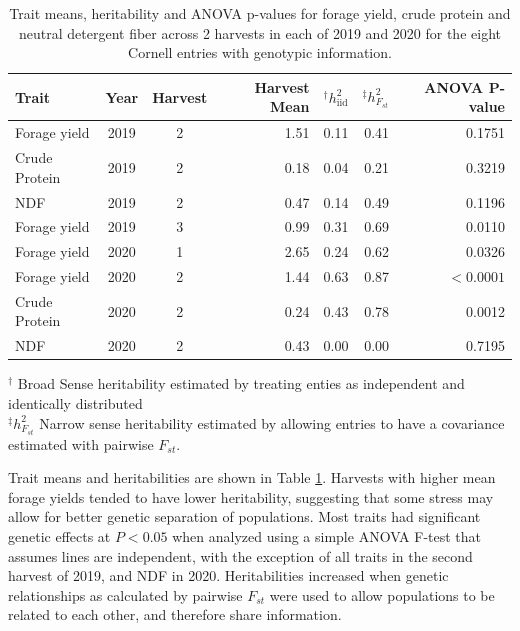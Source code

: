 \documentclass[12pt, letterpaper]{article}
\begin{document}
\begin{table}[ht]
\caption{Trait means, heritability and ANOVA p-values for forage yield, crude protein and neutral detergent fiber across 2 harvests in each of 2019 and 2020 for the eight Cornell entries with genotypic information.}
\centering
\begin{tabular*}{\hsize}{@{\extracolsep{\fill}}lccrrrr}
 Trait & Year & Harvest & Harvest Mean & $^\dagger h^2_\text{iid}$ & $^\ddagger h^2_{F_{st}}$ & ANOVA P-value \\ 
  \hline
  Forage yield & 2019 & 2 & 1.51 & 0.11 & 0.41 & 0.1751 \\ 
  Crude Protein & 2019 & 2 & 0.18 & 0.04 & 0.21 & 0.3219 \\ 
  NDF & 2019 & 2 & 0.47 & 0.14 & 0.49 & 0.1196 \\ 
  Forage yield & 2019 & 3 & 0.99 & 0.31 & 0.69 & 0.0110 \\ 
  Forage yield & 2020 & 1 & 2.65 & 0.24 & 0.62 & 0.0326 \\ 
  Forage yield & 2020 & 2 & 1.44 & 0.63 & 0.87 & $<0.0001$ \\ 
  Crude Protein & 2020 & 2 & 0.24 & 0.43 & 0.78 & 0.0012 \\ 
  NDF & 2020 & 2 & 0.43 & 0.00 & 0.00 & 0.7195 \\ 
   \hline
\end{tabular*}
\raggedright
$^\dagger$ Broad Sense heritability estimated by treating enties as independent and identically distributed \\
$^\ddagger h^2_{F_{st}}$ Narrow sense heritability estimated by allowing entries to have a covariance estimated with pairwise $F_{st}$.
\label{anovaTab}
\end{table}

Trait means and heritabilities are shown in Table \ref{anovaTab}. Harvests with higher mean forage yields tended to have lower heritability, suggesting that some stress may allow for better genetic separation of populations. Most traits had significant genetic effects at $P < 0.05$ when analyzed using a simple ANOVA F-test that assumes lines are independent, with the exception of all traits in the second harvest of 2019, and NDF in 2020. Heritabilities increased when genetic relationships as calculated by pairwise $F_{st}$ were used to allow populations to be related to each other, and therefore share information. 

\end{document}
